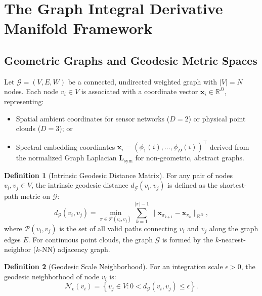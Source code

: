 \documentclass[11pt,a4paper]{article}
\theoremstyle{definition}
\newtheorem{definition}{Definition}
\begin{document}
\section{The Graph Integral Derivative Manifold Framework}
\label{sec:formulation}

\subsection{Geometric Graphs and Geodesic Metric Spaces}
Let $\mathcal{G} = (V, E, W)$ be a connected, undirected weighted graph with $|V| = N$ nodes. Each node $v_i \in V$ is associated with a coordinate vector $\mathbf{x}_i \in \mathbb{R}^D$, representing:
\begin{itemize}
    \item Spatial ambient coordinates for sensor networks ($D = 2$) or physical point clouds ($D = 3$); or
    \item Spectral embedding coordinates $\mathbf{x}_i = (\phi_1(i), \dots, \phi_D(i))^\top$ derived from the normalized Graph Laplacian $\mathbf{L}_{\text{sym}}$ for non-geometric, abstract graphs.
\end{itemize}

\begin{definition}[Intrinsic Geodesic Distance Matrix]
For any pair of nodes $v_i, v_j \in V$, the intrinsic geodesic distance $d_{\mathcal{G}}(v_i, v_j)$ is defined as the shortest-path metric on $\mathcal{G}$:
\begin{equation}
d_{\mathcal{G}}(v_i, v_j) = \min_{\pi \in \mathcal{P}(v_i, v_j)} \sum_{k=1}^{|\pi|-1} \|\mathbf{x}_{\pi_{k+1}} - \mathbf{x}_{\pi_k}\|_{\mathbb{R}^D},
\label{eq:geodesic_def}
\end{equation}
where $\mathcal{P}(v_i, v_j)$ is the set of all valid paths connecting $v_i$ and $v_j$ along the graph edges $E$. For continuous point clouds, the graph $\mathcal{G}$ is formed by the $k$-nearest-neighbor ($k$-NN) adjacency graph.
\end{definition}

\begin{definition}[Geodesic Scale Neighborhood]
For an integration scale $\epsilon > 0$, the geodesic neighborhood of node $v_i$ is:
\begin{equation}
\mathcal{N}_\epsilon(v_i) = \left\{ v_j \in V : 0 < d_{\mathcal{G}}(v_i, v_j) \le \epsilon \right\}.
\end{equation}
\end{definition}
\end{document}

